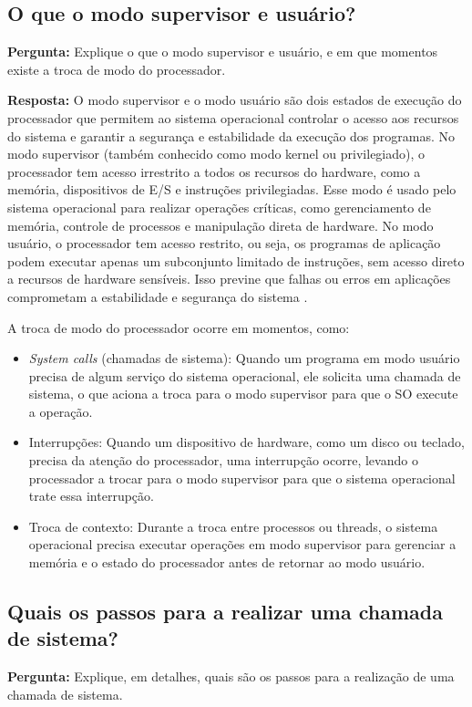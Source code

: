 \documentclass{article}
\begin{document}
\subsection{O que o modo supervisor e usuário?}

\textbf{Pergunta:} Explique o que o modo supervisor e usuário, e em que momentos existe a troca de modo do processador.\newline

\textbf{Resposta:} O modo supervisor e o modo usuário são dois estados de execução do processador que permitem ao sistema operacional controlar o acesso aos recursos do sistema e garantir a segurança e estabilidade da execução dos programas. No modo supervisor (também conhecido como modo kernel ou privilegiado), o processador tem acesso irrestrito a todos os recursos do hardware, como a memória, dispositivos de E/S e instruções privilegiadas. Esse modo é usado pelo sistema operacional para realizar operações críticas, como gerenciamento de memória, controle de processos e manipulação direta de hardware. No modo usuário, o processador tem acesso restrito, ou seja, os programas de aplicação podem executar apenas um subconjunto limitado de instruções, sem acesso direto a recursos de hardware sensíveis. Isso previne que falhas ou erros em aplicações comprometam a estabilidade e segurança do sistema \cite{gta_ufrj} \cite{tanenbaum2021}.\newline

A troca de modo do processador ocorre em momentos, como:

\begin{itemize}
    \item \textit{System calls} (chamadas de sistema): Quando um programa em modo usuário precisa de algum serviço do sistema operacional, ele solicita uma chamada de sistema, o que aciona a troca para o modo supervisor para que o SO execute a operação.
    \item Interrupções: Quando um dispositivo de hardware, como um disco ou teclado, precisa da atenção do processador, uma interrupção ocorre, levando o processador a trocar para o modo supervisor para que o sistema operacional trate essa interrupção.
    \item Troca de contexto: Durante a troca entre processos ou threads, o sistema operacional precisa executar operações em modo supervisor para gerenciar a memória e o estado do processador antes de retornar ao modo usuário.
\end{itemize}

\subsection{Quais os passos para a realizar uma chamada de sistema?}
\textbf{Pergunta:} Explique, em detalhes, quais são os passos para a realização de uma chamada de sistema.\newline
\end{document}
